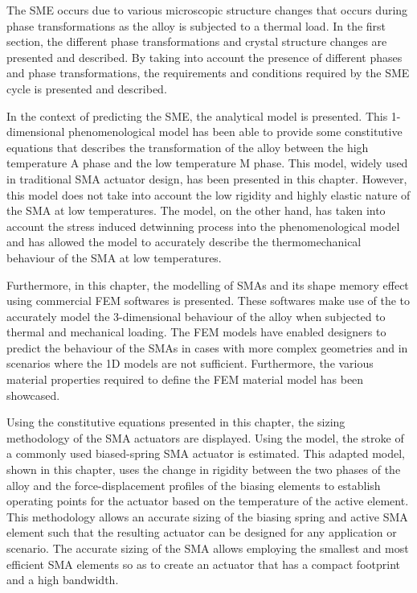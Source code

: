 The SME occurs due to various microscopic structure changes that occurs during phase transformations as the alloy is subjected to a thermal load. In the first section, the different phase transformations and crystal structure changes are presented and described. By taking into account the presence of different phases and phase transformations, the requirements and conditions required by the SME cycle is presented and described.

In the context of predicting the SME, the \cite{liangConstitutiveModelingShape1990a} analytical model is presented. This 1-dimensional phenomenological model has been able to provide some constitutive equations that describes the transformation of the alloy between the high temperature A phase and the low temperature M phase. This model, widely used in traditional SMA actuator design, has been presented in this chapter. However, this model does not take into account the low rigidity and highly elastic nature of the SMA at low temperatures. The \cite{brinsonOneDimensionalConstitutiveBehavior1993} model, on the other hand, has taken into account the stress induced detwinning process into the phenomenological model and has allowed the model to accurately describe the thermomechanical behaviour of the SMA at low temperatures.

Furthermore, in this chapter, the modelling of SMAs and its shape memory effect using commercial FEM softwares is presented. These softwares make use of the \cite{auricchioRobustIntegrationalgorithmFinitestrain2001} to accurately model the 3-dimensional behaviour of the alloy when subjected to thermal and mechanical loading. The FEM models have enabled designers to predict the behaviour of the SMAs in cases with more complex geometries and in scenarios where the 1D \cite{brinsonOneDimensionalConstitutiveBehavior1993} models are not sufficient. Furthermore, the various material properties required to define the FEM material model has been showcased.

Using the constitutive equations presented in this chapter, the sizing methodology of the SMA actuators are displayed. Using the \cite{brinsonOneDimensionalConstitutiveBehavior1993} model, the stroke of a commonly used biased-spring SMA actuator is estimated. This adapted model, shown in this chapter, uses the change in rigidity between the two phases of the alloy and the force-displacement profiles of the biasing elements to establish operating points for the actuator based on the temperature of the active element. This methodology allows an accurate sizing of the biasing spring and active SMA element such that the resulting actuator can be designed for any application or scenario. The accurate sizing of the SMA allows employing the smallest and most efficient SMA elements so as to create an actuator that has a compact footprint and a high bandwidth.

